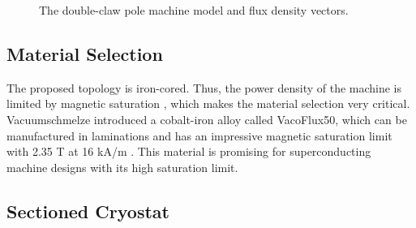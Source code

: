 \documentclass[12pt]{iopart}
\begin{document}
\begin{figure}[]
  \caption{The double-claw pole machine model and flux density vectors.} 
  \label{double_claw_parts}
\end{figure}

\subsection{Material Selection}

The proposed topology is iron-cored. Thus, the power density of the machine is limited by magnetic saturation , which makes the material selection very critical.  Vacuumschmelze introduced a cobalt-iron alloy called VacoFlux50, which  can be manufactured in laminations and has an impressive magnetic saturation limit with 2.35 T at 16 kA/m \cite{vacoflux}. This material is promising for superconducting machine designs with its high saturation limit.


\subsection{Sectioned Cryostat}
\end{document}
